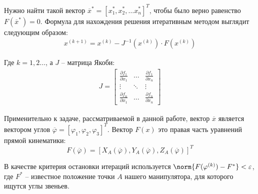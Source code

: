 Нужно найти такой вектор $ \overline{x}^*=[x_1^*, x_2^*, \dots x_n^*]^T $, чтобы было верно равенство $ F(\overline{x}^*) = 0 $. Формула для нахождения решения итеративным методом выглядит следующим образом:
\begin{align*} %
    x^{(k+1)}=x^{(k)}-J^{-1}(x^{(k)}) \cdot F(x^{(k)})
\end{align*} %

\noindent Где $ k=1,2\dots $, а $ J $ -- матрица Якоби:
\begin{align*}
    J = \begin{bmatrix}
        \frac{\partial f_1}{\partial x_1} & \dots & \frac{\partial f_1}{\partial x_n} \\
        \vdots & \ddots & \vdots \\
        \frac{\partial f_n}{\partial x_1} & \dots & \frac{\partial f_n}{\partial x_n}
    \end{bmatrix}
\end{align*}

Применительно к задаче, рассматриваемой в данной работе, вектор $ \overline{x} $ является  вектором углов $ \overline{\varphi} = [ \varphi_1, \varphi_2, \varphi_3 ]^T $. Вектор $ F(x) $ это правая часть уравнений прямой кинематики:
\begin{equation*}
    F(\overline{\varphi}) = [ X_A(\overline{\varphi}), Y_A(\overline{\varphi}), Z_A(\overline{\varphi}) ]^T
\end{equation*}

\noindent В качестве критерия остановки итераций используется $ \norm{F(\varphi^{(k)}) - F^* } < \varepsilon $, где $ F^* $ -- известное положение точки $ A $ нашего манипулятора, для которого ищутся углы звеньев. %

